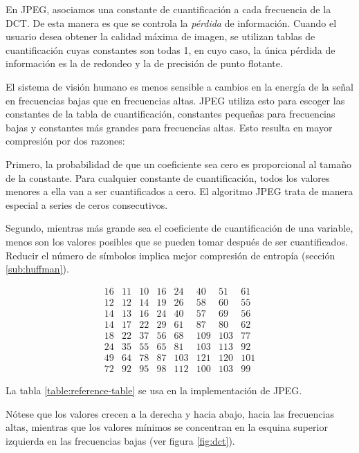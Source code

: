 En JPEG, asociamos una constante de cuantificación a cada frecuencia de la DCT.
De esta manera es que se controla la \emph{pérdida} de información. Cuando el
usuario desea obtener la calidad máxima de imagen, se utilizan tablas de
cuantificación cuyas constantes son todas 1, en cuyo caso, la única pérdida de
información es la de redondeo y la de precisión de punto flotante.

El sistema de visión humano es menos sensible a cambios en la energía de la
señal en frecuencias bajas que en frecuencias altas. JPEG utiliza esto para
escoger las constantes de la tabla de cuantificación, constantes pequeñas para
frecuencias bajas y constantes más grandes para frecuencias altas. Esto resulta
en mayor compresión por dos razones:

Primero, la probabilidad de que un coeficiente sea cero es proporcional al
tamaño de la constante. Para cualquier constante de cuantificación, todos los
valores menores a ella van a ser cuantificados a cero. El algoritmo JPEG trata
de manera especial a series de ceros consecutivos.

Segundo, mientras más grande sea el coeficiente de cuantificación de una
variable, menos son los valores posibles que se pueden tomar después de ser
cuantificados. Reducir el número de símbolos implica mejor compresión de
entropía (sección \ref{sub:huffman}).

\begin{equation}
    \begin{matrix}
        16 & 11 & 10 & 16 & 24  & 40  & 51  & 61 \\
        12 & 12 & 14 & 19 & 26  & 58  & 60  & 55 \\
        14 & 13 & 16 & 24 & 40  & 57  & 69  & 56 \\
        14 & 17 & 22 & 29 & 61  & 87  & 80  & 62 \\
        18 & 22 & 37 & 56 & 68  & 109 & 103 & 77 \\
        24 & 35 & 55 & 65 & 81  & 103 & 113 & 92 \\
        49 & 64 & 78 & 87 & 103 & 121 & 120 & 101 \\
        72 & 92 & 95 & 98 & 112 & 100 & 103 & 99
    \end{matrix}
    \label{table:reference-table}
\end{equation}

La tabla \ref{table:reference-table} se usa en la implementación de JPEG.

Nótese que los valores crecen a la derecha y hacia abajo, hacia las frecuencias
altas, mientras que los valores mínimos se concentran en la esquina superior
izquierda en las frecuencias bajas (ver figura \ref{fig:dct}).


